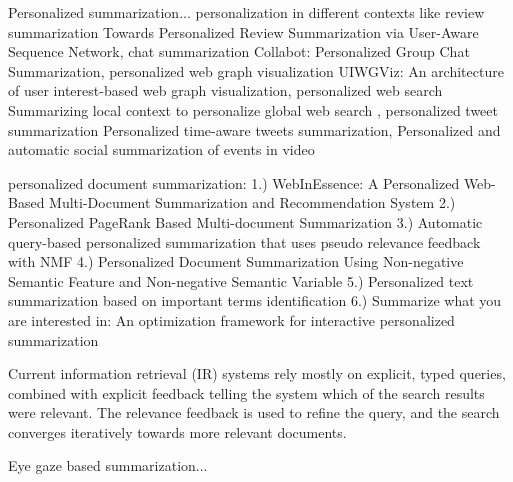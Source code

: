 \documentclass[12pt]{article}
\begin{document}
Personalized summarization... personalization in different contexts like review summarization {Towards Personalized Review Summarization via User-Aware Sequence Network}, chat summarization {Collabot: Personalized Group Chat Summarization}, personalized web graph visualization {UIWGViz: An architecture of user interest-based web graph visualization}, personalized web search {Summarizing local context to personalize global web search}
, personalized tweet summarization {Personalized time-aware tweets summarization}, {Personalized and automatic social summarization of events in video}


personalized document summarization:
1.) WebInEssence: A Personalized Web-Based Multi-Document
Summarization and Recommendation System
2.) Personalized PageRank Based Multi-document Summarization
3.) Automatic query-based personalized summarization that uses pseudo relevance feedback with NMF
4.) Personalized Document Summarization Using Non-negative Semantic Feature and Non-negative Semantic Variable
5.) Personalized text summarization based on important terms identification
6.) Summarize what you are interested in: An optimization framework for interactive personalized summarization


Current information retrieval (IR) systems rely mostly on explicit, typed queries,
combined with explicit feedback telling the system which of the search results were
relevant. The relevance feedback is used to refine the query, and the search converges
iteratively towards more relevant documents.


Eye gaze based summarization...
   
\end{document}

